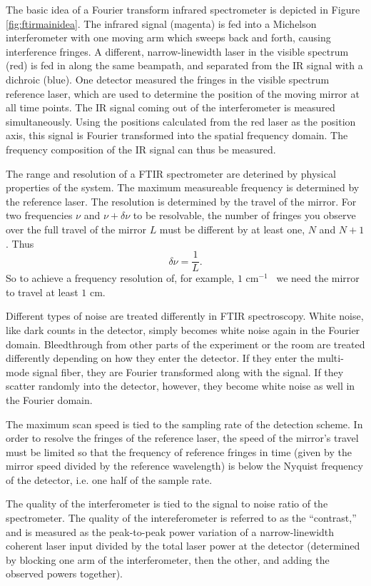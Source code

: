 \documentclass[12pt]{puthesis}
\newcommand{\wn}[1][ ]{cm$^{-1}$#1}
\begin{document}
The basic idea of a Fourier transform infrared spectrometer is depicted in Figure \ref{fig:ftirmainidea}. The infrared signal (magenta) is fed into a Michelson interferometer with one moving arm which sweeps back and forth, causing interference fringes. A different, narrow-linewidth laser in the visible spectrum (red) is fed in along the same beampath, and separated from the IR signal with a dichroic (blue). One detector measured the fringes in the visible spectrum reference laser, which are used to determine the position of the moving mirror at all time points. The IR signal coming out of the interferometer is measured simultaneously. Using the positions calculated from the red laser as the position axis, this signal is Fourier transformed into the spatial frequency domain. The frequency composition of the IR signal can thus be measured. 

The range and resolution of a FTIR spectrometer are deterined by physical properties of the system. The maximum measureable frequency is determined by the reference laser. The resolution is determined by the travel of the mirror. For two frequencies $\nu$ and $\nu+\delta\nu$ to be resolvable, the number of fringes you observe over the full travel of the mirror $L$ must be different by at least one, $N$ and $N+1$. Thus 
\begin{equation}\label{eq:9}
\delta \nu = \frac{1}{L}.
\end{equation}
So to achieve a frequency resolution of, for example, $1$ \wn\ we need the mirror to travel at least $1$ cm.

Different types of noise are treated differently in FTIR spectroscopy. White noise, like dark counts in the detector, simply becomes white noise again in the Fourier domain. Bleedthrough from other parts of the experiment or the room are treated differently depending on how they enter the detector. If they enter the multi-mode signal fiber, they are Fourier transformed along with the signal. If they scatter randomly into the detector, however, they become white noise as well in the Fourier domain.

The maximum scan speed is tied to the sampling rate of the detection scheme. In order to resolve the fringes of the reference laser, the speed of the mirror's travel must be limited so that the frequency of reference fringes in time (given by the mirror speed divided by the reference wavelength) is below the Nyquist frequency of the detector, i.e. one half of the sample rate.

The quality of the interferometer is tied to the signal to noise ratio of the spectrometer. The quality of the intereferometer is referred to as the ``contrast,'' and is measured as the peak-to-peak power variation of a narrow-linewidth coherent laser input divided by the total laser power at the detector (determined by blocking one arm of the interferometer, then the other, and adding the observed powers together).
\end{document}
